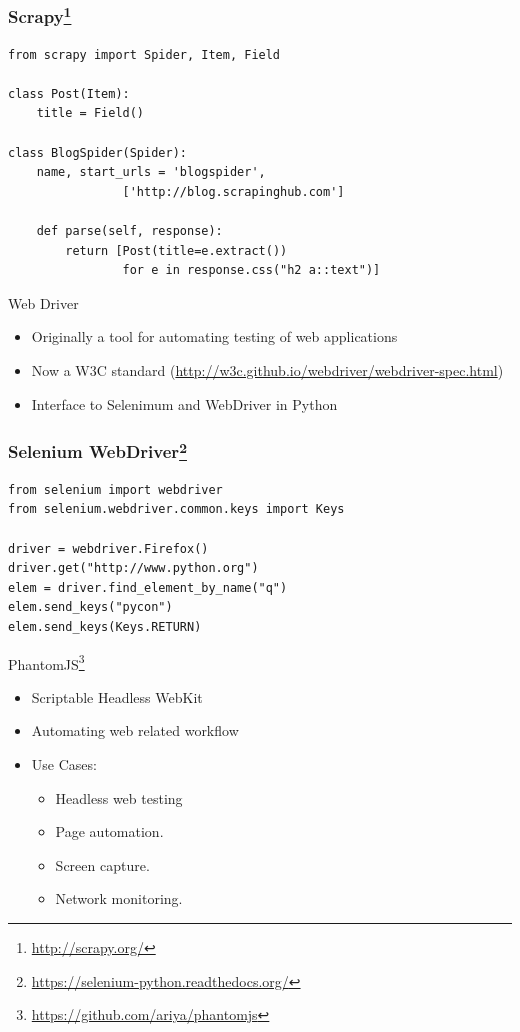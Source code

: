 \documentclass{beamer}
\newcommand{\furl}[1]{{\footnote{\url{#1}}}}
\begin{document}
\begin{frame}[fragile]
    \frametitle{Scrapy\furl{http://scrapy.org/}}
\begin{verbatim}
from scrapy import Spider, Item, Field

class Post(Item):
    title = Field()

class BlogSpider(Spider):
    name, start_urls = 'blogspider', 
                ['http://blog.scrapinghub.com']

    def parse(self, response):
        return [Post(title=e.extract()) 
                for e in response.css("h2 a::text")]
\end{verbatim}
\end{frame}


\begin{frame}{Web Driver}
    \begin{itemize}
        \item Originally a tool for automating testing of web applications
        \item Now a W3C standard (\url{http://w3c.github.io/webdriver/webdriver-spec.html})
        \item Interface to Selenimum and WebDriver in Python
    \end{itemize}
\end{frame}

\begin{frame}[fragile]
    \frametitle{Selenium WebDriver\furl{https://selenium-python.readthedocs.org/}}
\begin{verbatim}
from selenium import webdriver
from selenium.webdriver.common.keys import Keys

driver = webdriver.Firefox()
driver.get("http://www.python.org")
elem = driver.find_element_by_name("q")
elem.send_keys("pycon")
elem.send_keys(Keys.RETURN)
\end{verbatim}
\end{frame}

\begin{frame}{PhantomJS\furl{https://github.com/ariya/phantomjs}}
    \begin{itemize}
        \item Scriptable Headless WebKit
        \item Automating web related workflow
        \item Use Cases:
        \begin{itemize}
            \item Headless web testing
            \item Page automation.
            \item Screen capture. 
            \item Network monitoring. 
        \end{itemize}
    \end{itemize}
\end{frame}
\end{document}
